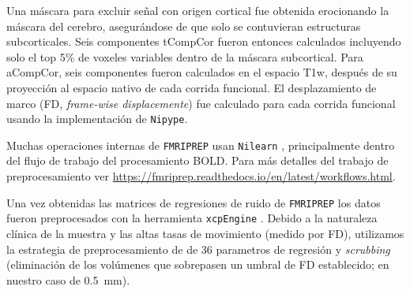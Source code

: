 Una máscara para excluir señal con origen cortical fue obtenida erocionando la máscara del cerebro, asegurándose de que solo se contuvieran estructuras subcorticales.
Seis componentes tCompCor fueron entonces calculados incluyendo solo el top 5\% de voxeles variables dentro de la máscara subcortical.
Para aCompCor, seis componentes fueron calculados en el espacio T1w, después de su proyección al espacio nativo de cada corrida funcional.
El desplazamiento de marco (FD, \textit{frame-wise displacemente}) \parencite{Power2014} fue calculado para cada corrida funcional usando la implementación de \texttt{Nipype}.\par
Muchas operaciones internas de \texttt{FMRIPREP} usan \texttt{Nilearn} \parencite{Abraham2014}, principalmente dentro del flujo de trabajo del procesamiento BOLD. Para más detalles del trabajo de preprocesamiento ver \url{https://fmriprep.readthedocs.io/en/latest/workflows.html}.\par
Una vez obtenidas las matrices de regresiones de ruido de \texttt{FMRIPREP} los datos fueron preprocesados con la herramienta \texttt{xcpEngine} \parencite{Ciric2017}.
Debido a la naturaleza clínica de la muestra y las altas tasas de movimiento (medido por FD), utilizamos la estrategia de preprocesamiento de \textcite{Power2014} de 36 parametros de regresión y \textit{scrubbing} (eliminación de los volúmenes que sobrepasen un umbral de FD establecido; en nuestro caso de \SI{0.5}{\milli\meter}).

